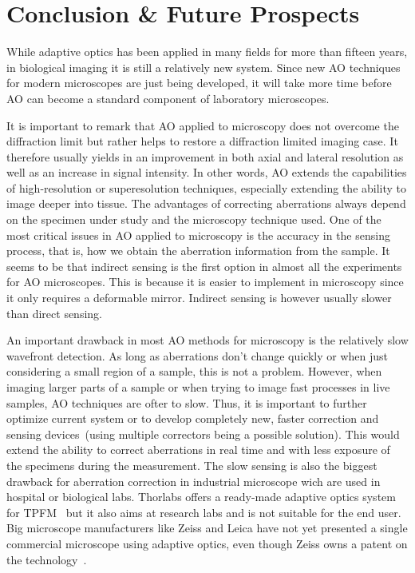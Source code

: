 \section{Conclusion \& Future Prospects}
\label{sec:Future}

While adaptive optics has been applied in many fields for more than fifteen years, in biological imaging it is still a relatively new system. Since new AO techniques for modern microscopes are just being developed, it will take more time before AO can become a standard component of laboratory microscopes.  

It is important to remark that AO applied to microscopy does not overcome the diffraction limit but rather helps to restore a diffraction limited imaging case. It therefore usually yields in an improvement in both axial and lateral resolution as well as an increase in signal intensity. In other words, AO extends the capabilities of high-resolution or superesolution techniques, especially extending the ability to image deeper into tissue. The advantages of correcting aberrations always depend on the specimen under study and the microscopy technique used. One of the most critical issues in AO applied to microscopy is the accuracy in the sensing process, that is, how we obtain the aberration information from the sample. It seems to be that indirect sensing is the first option in almost all the experiments for AO microscopes. This is because it is easier to implement in microscopy since it only requires a deformable mirror. Indirect sensing is however usually slower than direct sensing. 

An important drawback in most AO methods for microscopy is the relatively slow wavefront detection. As long as aberrations don't change quickly or when just considering a small region of a sample, this is not a problem. However, when imaging larger parts of a sample or when trying to image fast processes in live samples, AO techniques are ofter to slow. Thus, it is important to further optimize current system or to develop completely new, faster correction and sensing devices~(using multiple correctors being a possible solution). This would extend the ability to correct aberrations in real time and with less exposure of the specimens during the measurement. The slow sensing is also the biggest drawback for aberration correction in industrial microscope wich are used in hospital or biological labs. Thorlabs offers a ready-made adaptive optics system for TPFM~\cite{future_thorlabs} but it also aims at research labs and is not suitable for the end user. Big microscope manufacturers like Zeiss and Leica have not yet presented a single commercial microscope using adaptive optics, even though Zeiss owns a patent on the technology~\cite{future_zeiss_patent}.

